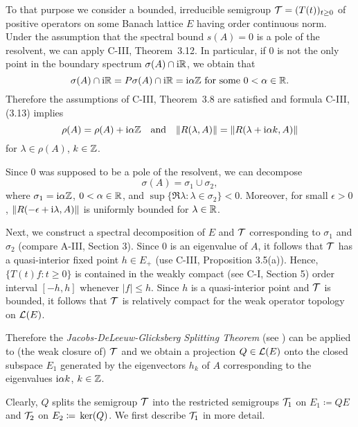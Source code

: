 To that purpose we consider a bounded, irreducible semigroup $\mathcal{T} = (T(t))_{t \geq 0}$ of positive operators on some Banach lattice $E$ having order continuous norm.
Under the assumption that the spectral bound $s(A) = 0$ is a pole of the resolvent, we can apply C-III, Theorem~3.12.
In particular, if $0$ is not the only point in the boundary spectrum $\sigma(A)\cap \mathrm{i}\mathbb{R}$, we obtain that
\begin{equation*}\label{eq:c4-2.9-kgk}
\sigma(A)\cap \mathrm{i}\mathbb{R} = P{\sigma}(A)\cap \mathrm{i}\mathbb{R} = \mathrm{i}\alpha\mathbb{Z} \text{ for some } 0 < \alpha \in \mathbb{R}.
\end{equation*}
Therefore the assumptions of C-III, Theorem~3.8 are satisfied and formula C-III, (3.13) implies
\begin{equation}\label{eq:c4-2.10}
\rho(A) = \rho(A) + \mathrm{i}\alpha\mathbb{Z} \quad \text{and} \quad \|R(\lambda,A)\| = \|R(\lambda+\mathrm{i}\alpha k,A)\|
\end{equation}
for $\lambda \in \rho(A)$, $k \in \mathbb{Z}$.

Since $0$ was supposed to be a pole of the resolvent, we can decompose
\begin{equation*}\label{eq:c4-2.10-kgk}
\sigma(A) = \sigma_{1} \cup \sigma_{2},
\end{equation*}
where $\sigma_{1} = \mathrm{i}\alpha\mathbb{Z}$, $0 < \alpha \in \mathbb{R}$, and $\sup\{\Re \lambda \colon \lambda \in \sigma_{2}\} < 0$.
Moreover, for small $\epsilon > 0$, $\|R(-\epsilon+\mathrm{i}\lambda,A)\|$ is uniformly bounded for $\lambda \in \mathbb{R}$.

Next, we construct a spectral decomposition of $E$ and $\mathcal{T}$ corresponding to $\sigma_{1}$ and $\sigma_{2}$ (compare A-III, Section 3).
Since $0$ is an eigenvalue of $A$, it follows that $\mathcal{T}$ has a quasi-interior fixed point $h \in E_{+}$ (use C-III, Proposition 3.5(a)).
Hence, $\{T(t)f \colon t \geq 0\}$ is contained in the weakly compact (see C-I, Section 5) order interval $[-h,h]$ whenever $|f| \leq h$.
Since $h$ is a quasi-interior point and $\mathcal{T}$ is bounded, it follows that $\mathcal{T}$ is relatively compact for the weak operator topology on $\mathcal{L}(E)$.

Therefore the \emph{Jacobs-DeLeeuw-Glicksberg Splitting Theorem} (see \citet[Chapter 2, Theorem 4.4 and 4.5]{krengel:1985}) can be applied to (the weak closure of) $\mathcal{T}$ and we obtain a projection $Q \in \mathcal{L}(E)$ onto the closed subspace $E_{1}$ generated by the eigenvectors $h_{k}$ of $A$ corresponding to the eigenvalues $\mathrm{i}\alpha k$, $k \in \mathbb{Z}$.

Clearly, $Q$ splits the semigroup $\mathcal{T}$ into the restricted semigroups $\mathcal{T}_{1}$ on $E_{1} \coloneqq QE$ and $\mathcal{T}_{2}$ on $E_{2} \coloneqq \mathop{}\mathrm{ker}(Q)$.
We first describe $\mathcal{T}_{1}$ in more detail.

